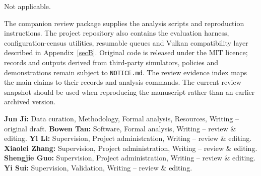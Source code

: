 \documentclass[pdflatex,iicol,sn-apa]{sn-jnl}
\theoremstyle{remark}
\begin{document}
Not applicable.

The companion review package supplies the analysis scripts and reproduction instructions. The
project repository also contains the evaluation harness, configuration-census utilities, resumable
queues and Vulkan compatibility layer described in Appendix~\ref{secB}. Original code is released
under the MIT licence; records and outputs derived from third-party simulators, policies and
demonstrations remain subject to \texttt{NOTICE.md}. The review evidence index maps the main claims
to their records and analysis commands. The current review snapshot should be used when reproducing
the manuscript rather than an earlier archived version.

\textbf{Jun Ji:} Data curation, Methodology, Formal analysis, Resources, Writing -- original draft.
\textbf{Bowen Tan:} Software, Formal analysis, Writing -- review \& editing.
\textbf{Yi Li:} Supervision, Project administration, Writing -- review \& editing.
\textbf{Xiaolei Zhang:} Supervision, Project administration, Writing -- review \& editing.
\textbf{Shengjie Guo:} Supervision, Project administration, Writing -- review \& editing.
\textbf{Yi Sui:} Supervision, Validation, Writing -- review \& editing.
\end{document}

